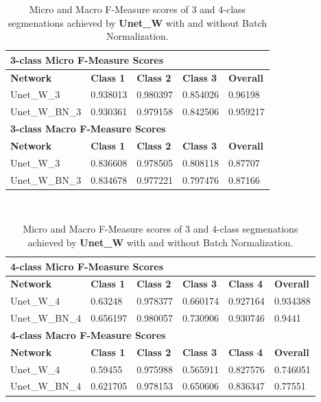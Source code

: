 \begin {table}
	\begin{flushleft}
		\begin {tabular}[!ht]{|l|l|l|l|l|}
			\hline\multicolumn{5}{|l|}{\textbf{3-class Micro F-Measure Scores}} \\ \hline
			\textbf{Network}& \textbf{Class 1}& \textbf{Class 2}& \textbf{Class 3}& \textbf{Overall} \\ \hline
			Unet\_W\_3& \cellcolor{green!25}0.938013& \cellcolor{green!25}0.980397& \cellcolor{green!25}0.854026& \cellcolor{green!25}0.96198 \\ \hline
			Unet\_W\_BN\_3& 0.930361&  0.979158& 0.842506& 0.959217\\ \hline
			\multicolumn{5}{|l|}{\textbf{3-class Macro F-Measure Scores}} \\ \hline
			\textbf{Network}& \textbf{Class 1}& \textbf{Class 2}& \textbf{Class 3}& \textbf{Overall} \\ \hline
			Unet\_W\_3& \cellcolor{green!25}0.836608& \cellcolor{green!25}0.978505& \cellcolor{green!25}0.808118& \cellcolor{green!25}0.87707 \\ \hline
			Unet\_W\_BN\_3& 0.834678& 0.977221& 0.797476& 0.87166\\ \hline
		\end {tabular}
		\vspace{0.5cm}\\
		\begin {tabular}[!ht]{|l|l|l|l|l|l|}
			\hline\multicolumn{6}{|l|}{\textbf{4-class Micro F-Measure Scores}} \\ \hline
			\textbf{Network}& \textbf{Class 1}& \textbf{Class 2}& \textbf{Class 3}& \textbf{Class 4}& \textbf{Overall} \\ \hline
			Unet\_W\_4& 0.63248& 0.978377& 0.660174& 0.927164& 0.934388 \\ \hline
			Unet\_W\_BN\_4& \cellcolor{green!25}0.656197& \cellcolor{green!25}0.980057& \cellcolor{green!25}0.730906& \cellcolor{green!25}0.930746& \cellcolor{green!25}0.9441\\ \hline
			\multicolumn{6}{|l|}{\textbf{4-class Macro F-Measure Scores}} \\ \hline
			\textbf{Network}& \textbf{Class 1}& \textbf{Class 2}& \textbf{Class 3}& \textbf{Class 4}& \textbf{Overall} \\ \hline
			Unet\_W\_4& 0.59455& 0.975988& 0.565911& 0.827576& 0.746051 \\ \hline
			Unet\_W\_BN\_4& \cellcolor{green!25}0.621705& \cellcolor{green!25}0.978153& \cellcolor{green!25}0.650606& \cellcolor{green!25}0.836347& \cellcolor{green!25}0.77551\\ \hline
		\end {tabular}
	\end {flushleft}

\caption[Micro and Macro F-Measure scores for a network with and without Batch Normalization.]{Micro and Macro F-Measure scores of 3 and 4-class segmenations achieved by \textbf{Unet\_W} with and without Batch Normalization.}
\label{tab:results2}
\end {table}


